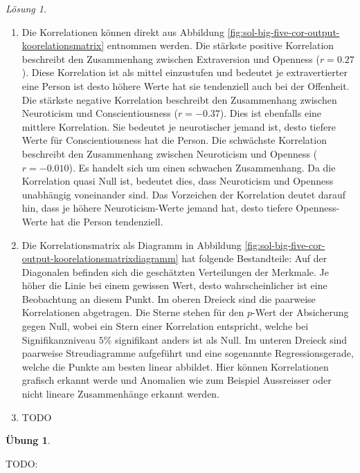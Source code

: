 \documentclass[
]{book}
\providecommand{\tightlist}{%
  \setlength{\itemsep}{0pt}\setlength{\parskip}{0pt}}
\theoremstyle{definition}
\theoremstyle{definition}
\theoremstyle{definition}
\newtheorem{exercise}{Übung}[chapter]
\theoremstyle{definition}
\theoremstyle{remark}
\newtheorem*{solution}{Lösung}
\begin{document}
\begin{solution}
\begin{enumerate}
\def\labelenumi{\alph{enumi})}
\tightlist
\item
  Die Korrelationen können direkt aus Abbildung \ref{fig:sol-big-five-cor-output-koorelationsmatrix} entnommen werden. Die stärkste positive Korrelation beschreibt den Zusammenhang zwischen Extraversion und Openness (\(r = 0.27\)). Diese Korrelation ist als mittel einzustufen und bedeutet je extravertierter eine Person ist desto höhere Werte hat sie tendenziell auch bei der Offenheit. Die stärkste negative Korrelation beschreibt den Zusammenhang zwischen Neuroticism und Conscientiousness (\(r = -0.37\)). Dies ist ebenfalls eine mittlere Korrelation. Sie bedeutet je neurotischer jemand ist, desto tiefere Werte für Conscientiousness hat die Person. Die schwächste Korrelation beschreibt den Zusammenhang zwischen Neuroticism und Openness (\(r = -0.010\)). Es handelt sich um einen schwachen Zusammenhang. Da die Korrelation quasi Null ist, bedeutet dies, dass Neuroticism und Openness unabhängig voneinander sind. Das Vorzeichen der Korrelation deutet darauf hin, dass je höhere Neuroticism-Werte jemand hat, desto tiefere Openness-Werte hat die Person tendenziell.
\item
  Die Korrelationsmatrix als Diagramm in Abbildung \ref{fig:sol-big-five-cor-output-koorelationsmatrixdiagramm} hat folgende Bestandteile: Auf der Diagonalen befinden sich die geschätzten Verteilungen der Merkmale. Je höher die Linie bei einem gewissen Wert, desto wahrscheinlicher ist eine Beobachtung an diesem Punkt. Im oberen Dreieck sind die paarweise Korrelationen abgetragen. Die Sterne stehen für den \(p\)-Wert der Absicherung gegen Null, wobei ein Stern einer Korrelation entspricht, welche bei Signifikanzniveau \(5\%\) signifikant anders ist als Null. Im unteren Dreieck sind paarweise Streudiagramme aufgeführt und eine sogenannte Regressionsgerade, welche die Punkte am besten linear abbildet. Hier können Korrelationen grafisch erkannt werde und Anomalien wie zum Beispiel Aussreisser oder nicht lineare Zusammenhänge erkannt werden.
\item
  TODO
\end{enumerate}

\end{solution}

\begin{exercise}
\protect\hypertarget{exr:body-shoe}{}\label{exr:body-shoe}\leavevmode

TODO:

\end{exercise}
\end{document}
